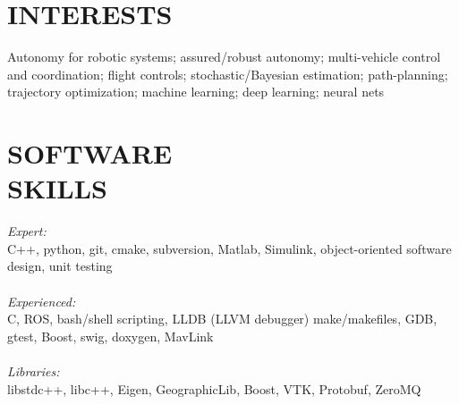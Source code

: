 \documentclass[margin]{res} %
\begin{document}
\begin{resume}

%
%


\section{INTERESTS}

Autonomy for robotic systems; assured/robust autonomy; multi-vehicle control and coordination; flight controls; stochastic/Bayesian estimation; path-planning; trajectory optimization; machine learning; deep learning; neural nets


\section{SOFTWARE \\ SKILLS}

{\sl Expert:} \\
C++, python, git, cmake, subversion, Matlab, Simulink, object-oriented software design, unit testing \\ \\
{\sl Experienced:} \\
C, ROS, bash/shell scripting, LLDB (LLVM debugger) make/makefiles,  GDB, gtest, Boost, swig, doxygen, MavLink \\ \\
{\sl Libraries:} \\
libstdc++, libc++, Eigen, GeographicLib, Boost, VTK, Protobuf, ZeroMQ



\end{resume}
\end{document}
